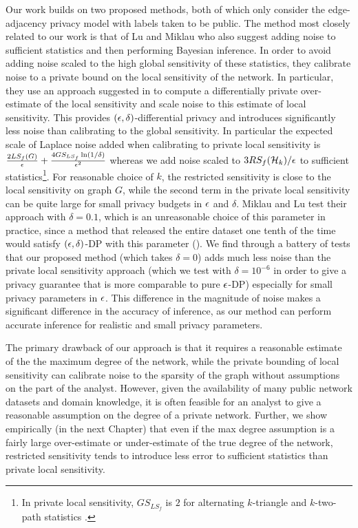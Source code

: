 Our work builds on two proposed methods, both of which only consider the edge-adjacency privacy model with labels taken to be public. The method most closely related to our work is that of Lu and Miklau \cite{LM14} who also suggest adding noise to sufficient statistics and then performing Bayesian inference. In order to avoid adding noise scaled to the high global sensitivity of these statistics, they calibrate noise to a private bound on the local sensitivity of the network. In particular, they use an approach suggested in \cite{KRSY14} to compute a differentially private over-estimate of the local sensitivity and scale noise to this estimate of local sensitivity. This provides $(\epsilon, \delta)$-differential privacy and introduces significantly less noise than calibrating to the global sensitivity. In particular the expected scale of Laplace noise added when calibrating to private local sensitivity is $\frac{2 LS_f(G)}{\epsilon} + \frac{4 GS_{LS_f} \ln (1/\delta)}{\epsilon^2}$ whereas we add noise scaled to $3RS_f(\mathcal{H}_k)/\epsilon$ to sufficient statistics\footnote{In private local sensitivity, $GS_{LS_f}$ is $2$ for alternating $k$-triangle and $k$-two-path statistics \cite{LM14}.}. For reasonable choice of $k$, the restricted sensitivity is close to the local sensitivity on graph $G$, while the second term in the private local sensitivity can be quite large for small privacy budgets in $\epsilon$ and $\delta$. Miklau and Lu test their approach with $\delta = 0.1$, which is an unreasonable choice of this parameter in practice, since a method that released the entire dataset one tenth of the time would satisfy $(\epsilon, \delta)$-DP with this parameter ().  We find through a battery of tests that our proposed method (which takes $\delta = 0$) adds much less noise than the private local sensitivity approach (which we test with $\delta = 10^{-6}$ in order to give a privacy guarantee that is more comparable to pure $\epsilon$-DP) especially for small privacy parameters in $\epsilon$. This difference in the magnitude of noise makes a significant difference in the accuracy of inference, as our method can perform accurate inference for realistic and small privacy parameters. 

The primary drawback of our approach is that it requires a reasonable estimate of the the maximum degree of the network, while the private bounding of local sensitivity can calibrate noise to the sparsity of the graph without assumptions on the part of the analyst. However, given the availability of many public network datasets and domain knowledge, it is often feasible for an analyst to give a reasonable assumption on the degree of a private network. Further, we show empirically (in the next Chapter) that even if the max degree assumption is a fairly large over-estimate or under-estimate of the true degree of the network, restricted sensitivity tends to introduce less error to sufficient statistics than private local sensitivity.  

